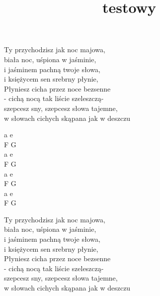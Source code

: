 \documentclass[11pt]{book}
\title{testowy}
\begin{document}
        \begin{minipage}{\dimexpr.4\textwidth-.4\columnsep}
            \noindent Ty przychodzisz jak noc majowa,\\
            biała noc, uśpiona w jaśminie,\\
            i jaśminem pachną twoje słowa,\\
            i księżycem sen srebrny płynie,\\
            \hfill\break
            Płyniesz cicha przez noce bezsenne\\
            - cichą nocą tak liście szeleszczą-\\
            szepcesz sny, szepcesz słowa tajemne,\\
            w słowach cichych skąpana jak w deszczu\\
        \end{minipage}
        \hfill
        \begin{minipage}{\dimexpr.05\textwidth-.05\columnsep}
            \ifchorded
            \noindent a e\\
            F G\\
            a e\\
            F G\\
            \hfill\break
            a e\\
            F G\\
            a e\\
            F G\\
            \else
            \fi
        \end{minipage}
        \hfill
        \begin{minipage}{\dimexpr.4\textwidth-.4\columnsep}
            \noindent Ty przychodzisz jak noc majowa,\\
            biała noc, uśpiona w jaśminie,\\
            i jaśminem pachną twoje słowa,\\
            i księżycem sen srebrny płynie,\\
            \hfill\break
            Płyniesz cicha przez noce bezsenne\\
            - cichą nocą tak liście szeleszczą-\\
            szepcesz sny, szepcesz słowa tajemne,\\
            w słowach cichych skąpana jak w deszczu\\
        \end{minipage}
\end{document}
